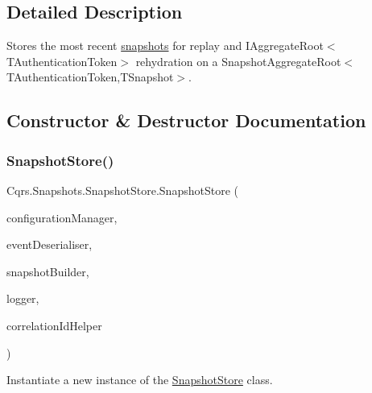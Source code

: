 \subsection{Detailed Description}
Stores the most recent \hyperlink{classCqrs_1_1Snapshots_1_1Snapshot}{snapshots} for replay and I\+Aggregate\+Root$<$\+T\+Authentication\+Token$>$ rehydration on a Snapshot\+Aggregate\+Root$<$\+T\+Authentication\+Token,\+T\+Snapshot$>$. 



\subsection{Constructor \& Destructor Documentation}
\mbox{\label{classCqrs_1_1Snapshots_1_1SnapshotStore_aa8ab186f864443c7d9647a4522864a84_aa8ab186f864443c7d9647a4522864a84}} 
\subsubsection{\texorpdfstring{Snapshot\+Store()}{SnapshotStore()}}
{\footnotesize\ttfamily Cqrs.\+Snapshots.\+Snapshot\+Store.\+Snapshot\+Store (\begin{DoxyParamCaption}\item[{\hyperlink{interfaceCqrs_1_1Configuration_1_1IConfigurationManager}{I\+Configuration\+Manager}}]{configuration\+Manager,  }\item[{\hyperlink{interfaceCqrs_1_1Events_1_1ISnapshotDeserialiser}{I\+Snapshot\+Deserialiser}}]{event\+Deserialiser,  }\item[{\hyperlink{interfaceCqrs_1_1Events_1_1ISnapshotBuilder}{I\+Snapshot\+Builder}}]{snapshot\+Builder,  }\item[{I\+Logger}]{logger,  }\item[{I\+Correlation\+Id\+Helper}]{correlation\+Id\+Helper }\end{DoxyParamCaption})\hspace{0.3cm}{\ttfamily [protected]}}



Instantiate a new instance of the \hyperlink{classCqrs_1_1Snapshots_1_1SnapshotStore}{Snapshot\+Store} class. 



